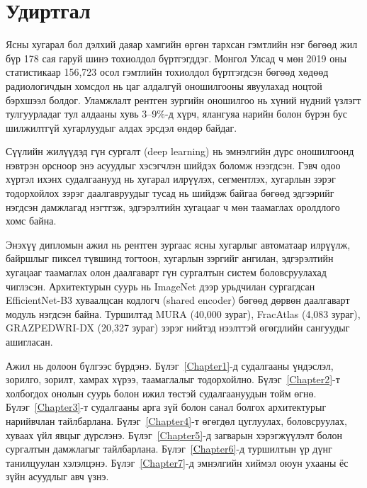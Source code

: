 
{}
\label{Introduction}

\section*{Удиртгал}

Ясны хугарал бол дэлхий даяар хамгийн өргөн тархсан гэмтлийн нэг бөгөөд жил бүр 178 сая гаруй шинэ тохиолдол бүртгэгддэг. Монгол Улсад ч мөн 2019 оны статистикаар 156,723 осол гэмтлийн тохиолдол бүртгэгдсэн бөгөөд хөдөөд радиологичдын хомсдол нь цаг алдалгүй оношилгооны явуулахад ноцтой бэрхшээл болдог. Уламжлалт рентген зургийн оношилгоо нь хүний нүдний үзлэгт тулгуурладаг тул алдааны хувь 3--9\%-д хүрч, ялангуяа нарийн болон бүрэн бус шилжилтгүй хугарлуудыг алдах эрсдэл өндөр байдаг.

Сүүлийн жилүүдэд гүн сургалт (deep learning) нь эмнэлгийн дүрс оношилгоонд нэвтрэн орсноор энэ асуудлыг хэсэгчлэн шийдэх боломж нээгдсэн. Гэвч одоо хүртэл ихэнх судалгаанууд нь хугарал илрүүлэх, сегментлэх, хугарлын зэрэг тодорхойлох зэрэг даалгавруудыг тусад нь шийдэж байгаа бөгөөд эдгээрийг нэгдсэн дамжлагад нэгтгэж, эдгэрэлтийн хугацааг ч мөн таамаглах оролдлого хомс байна.

Энэхүү дипломын ажил нь рентген зургаас ясны хугарлыг автоматаар илрүүлж, байршлыг пиксел түвшинд тогтоон, хугарлын зэргийг ангилан, эдгэрэлтийн хугацааг таамаглах олон даалгаварт гүн сургалтын систем боловсруулахад чиглэсэн. Архитектурын суурь нь ImageNet дээр урьдчилан сургагдсан EfficientNet-B3 хуваалцсан кодлогч (shared encoder) бөгөөд дөрвөн даалгаварт модуль нэгдсэн байна. Туршилтад MURA (40,000 зураг), FracAtlas (4,083 зураг), GRAZPEDWRI-DX (20,327 зураг) зэрэг нийтэд нээлттэй өгөгдлийн сангуудыг ашигласан.

Ажил нь долоон бүлгээс бүрдэнэ. Бүлэг~\ref{Chapter1}-д судалгааны үндэслэл, зорилго, зорилт, хамрах хүрээ, таамаглалыг тодорхойлно. Бүлэг~\ref{Chapter2}-т холбогдох онолын суурь болон ижил төстэй судалгаануудын тойм өгнө. Бүлэг~\ref{Chapter3}-т судалгааны арга зүй болон санал болгох архитектурыг нарийвчлан тайлбарлана. Бүлэг~\ref{Chapter4}-т өгөгдөл цуглуулах, боловсруулах, хуваах үйл явцыг дүрслэнэ. Бүлэг~\ref{Chapter5}-д загварын хэрэгжүүлэлт болон сургалтын дамжлагыг тайлбарлана. Бүлэг~\ref{Chapter6}-д туршилтын үр дүнг танилцуулан хэлэлцэнэ. Бүлэг~\ref{Chapter7}-д эмнэлгийн хиймэл оюун ухааны ёс зүйн асуудлыг авч үзнэ.
